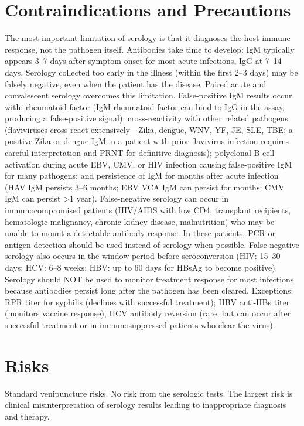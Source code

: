 \section*{Contraindications and Precautions}
The most important limitation of serology is that it diagnoses the host immune response, not the pathogen itself. Antibodies take time to develop: IgM typically appears 3--7 days after symptom onset for most acute infections, IgG at 7--14 days. Serology collected too early in the illness (within the first 2--3 days) may be falsely negative, even when the patient has the disease. Paired acute and convalescent serology overcomes this limitation. False-positive IgM results occur with: rheumatoid factor (IgM rheumatoid factor can bind to IgG in the assay, producing a false-positive signal); cross-reactivity with other related pathogens (flaviviruses cross-react extensively---Zika, dengue, WNV, YF, JE, SLE, TBE; a positive Zika or dengue IgM in a patient with prior flavivirus infection requires careful interpretation and PRNT for definitive diagnosis); polyclonal B-cell activation during acute EBV, CMV, or HIV infection causing false-positive IgM for many pathogens; and persistence of IgM for months after acute infection (HAV IgM persists 3--6 months; EBV VCA IgM can persist for months; CMV IgM can persist >1 year). False-negative serology can occur in immunocompromised patients (HIV/AIDS with low CD4, transplant recipients, hematologic malignancy, chronic kidney disease, malnutrition) who may be unable to mount a detectable antibody response. In these patients, PCR or antigen detection should be used instead of serology when possible. False-negative serology also occurs in the window period before seroconversion (HIV: 15--30 days; HCV: 6--8 weeks; HBV: up to 60 days for HBsAg to become positive). Serology should NOT be used to monitor treatment response for most infections because antibodies persist long after the pathogen has been cleared. Exceptions: RPR titer for syphilis (declines with successful treatment); HBV anti-HBs titer (monitors vaccine response); HCV antibody reversion (rare, but can occur after successful treatment or in immunosuppressed patients who clear the virus).

\section*{Risks}
Standard venipuncture risks. No risk from the serologic tests. The largest risk is clinical misinterpretation of serology results leading to inappropriate diagnosis and therapy.

